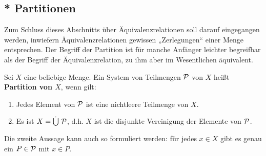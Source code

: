 \subsection*{* Partitionen}


Zum Schluss dieses Abschnitts über Äquivalenzrelationen soll darauf eingegangen werden, inwiefern Äquivalenzrelationen gewissen „Zerlegungen“ einer Menge entsprechen. Der Begriff der Partition ist für manche Anfänger leichter begreifbar als der Begriff der Äquivalenzrelation, zu ihm aber im Wesentlichen äquivalent.


\begin{defin}[Partition] 
    Sei $X$ eine beliebige Menge. Ein System von Teilmengen $\mathcal P$ von $X$ heißt \textbf{Partition von $X$}, wenn gilt:
    \begin{enumerate}[label=(P\arabic*), labelindent=1.5em, leftmargin=*]
        \item Jedes Element von $\mathcal P$ ist eine nichtleere Teilmenge von $X$.
        \item Es ist $X=\dot{\bigcup}\ \mathcal P$, d.h. $X$ ist die disjunkte Vereinigung der Elemente von $\mathcal P$.
    \end{enumerate}
    Die zweite Aussage kann auch so formuliert werden: für jedes $x\in X$ gibt es genau ein $P\in \mathcal P$ mit $x\in P$.
\end{defin}


